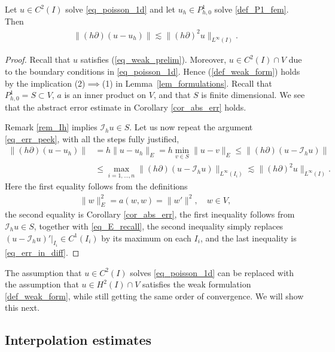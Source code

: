 \documentclass[12pt,oneside,final]{amsart}
\def\I{\mathcal I}
\begin{document}
\begin{theorem}
Let $u \in C^2(I)$ solve \eqref{eq_poisson_1d}
and let $u_h \in P_{h,0}^1$ solve \eqref{def_P1_fem}.
Then
    \begin{align*}
\|(h\partial)(u-u_h)\|
\lesssim
\|(h \partial)^2 u\|_{L^\infty(I)}.
    \end{align*}
\end{theorem}
\begin{proof}
Recall that $u$ satisfies (\ref{eq_weak_prelim}).
Moreover, $u \in C^2(I) \cap V$ due to the boundary conditions in \eqref{eq_poisson_1d}. Hence (\ref{def_weak_form}) holds by the implication (2)$\implies$(1) in Lemma~\ref{lem_formulations}.
Recall that $P_{h,0}^1 = S \subset V$,
$a$ is an inner product on $V$, and that $S$ is finite dimensional. 
We see that the abstract error estimate in Corollary \ref{cor_abs_err} holds.

Remark \ref{rem_Ih} implies $\I_h u \in S$. Let us now repeat the argument \eqref{eq_err_peek}, with all the steps fully justified,
    \begin{align*}
\|(h\partial)(u-u_h)\|
&= 
h\|u-u_h\|_E 
= 
h \min_{v \in S}\|u-v\|_E
\le 
\|(h\partial)(u-\I_h u)\|
\\&\le
\max_{i=1,\dots,n}\|(h\partial)(u - \I_h u)\|_{L^\infty(I_i)} 
\lesssim
\|(h \partial)^2 u\|_{L^\infty(I)}.
    \end{align*}
Here the first equality follows from the definitions 
    \begin{align}\label{eq_E_recall}
\|w\|_E^2 = a(w,w) = \|w'\|^2, \quad w \in V,
    \end{align}
the second equality is Corollary \ref{cor_abs_err},
the first inequality follows from $\I_h u \in S$, together with \eqref{eq_E_recall}, 
the second inequality simply replaces $(u - \I_h u)'|_{I_i} \in C^1(I_i)$ by its maximum on each $I_i$, and the last inequality is \eqref{eq_err_in_diff}.
\end{proof}

The assumption that $u \in C^2(I)$ solves \eqref{eq_poisson_1d}
can be replaced with the assumption that $u \in H^2(I) \cap V$ satisfies the weak formulation \eqref{def_weak_form},
while still getting the same order of convergence. We will show this next. 

\subsection{Interpolation estimates\label{sec_interp}}
\end{document}

